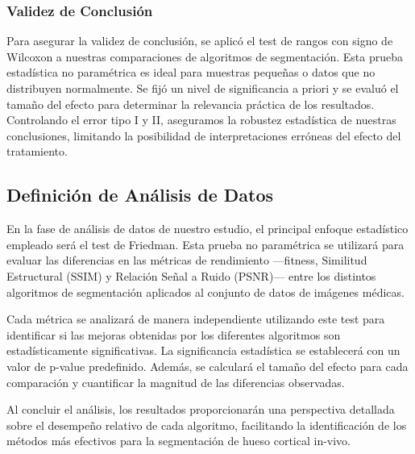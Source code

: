\documentclass[conference]{IEEEtran}
\begin{document}
\subsubsection{Validez de Conclusión}

\noindent Para asegurar la validez de conclusión, se aplicó el test de rangos con signo de Wilcoxon a nuestras comparaciones de algoritmos de segmentación. Esta prueba estadística no paramétrica es ideal para muestras pequeñas o datos que no distribuyen normalmente. Se fijó un nivel de significancia a priori y se evaluó el tamaño del efecto para determinar la relevancia práctica de los resultados. Controlando el error tipo I y II, aseguramos la robustez estadística de nuestras conclusiones, limitando la posibilidad de interpretaciones erróneas del efecto del tratamiento.

\subsection{Definición de Análisis de Datos}

\noindent En la fase de análisis de datos de nuestro estudio, el principal enfoque estadístico empleado será el test de Friedman. Esta prueba no paramétrica se utilizará para evaluar las diferencias en las métricas de rendimiento —fitness, Similitud Estructural (SSIM) y Relación Señal a Ruido (PSNR)— entre los distintos algoritmos de segmentación aplicados al conjunto de datos de imágenes médicas.


\noindent Cada métrica se analizará de manera independiente utilizando este test para identificar si las mejoras obtenidas por los diferentes algoritmos son estadísticamente significativas. La significancia estadística se establecerá con un valor de p-value predefinido. Además, se calculará el tamaño del efecto para cada comparación y cuantificar la magnitud de las diferencias observadas.

\noindent Al concluir el análisis, los resultados proporcionarán una perspectiva detallada sobre el desempeño relativo de cada algoritmo, facilitando la identificación de los métodos más efectivos para la segmentación de hueso cortical in-vivo.
\end{document}
